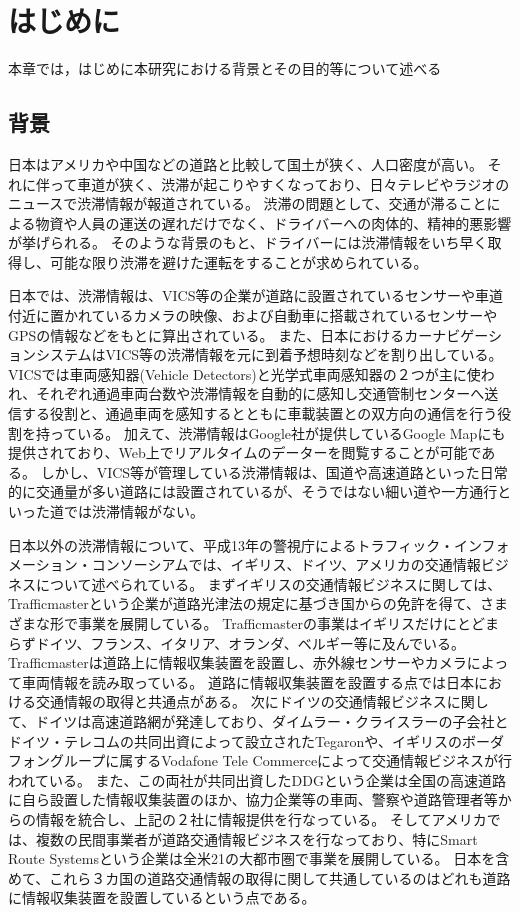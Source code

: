 \chapter{はじめに}
本章では，はじめに本研究における背景とその目的等について述べる
\section{背景}
日本はアメリカや中国などの道路と比較して国土が狭く、人口密度が高い。
それに伴って車道が狭く、渋滞が起こりやすくなっており、日々テレビやラジオのニュースで渋滞情報が報道されている。
渋滞の問題として、交通が滞ることによる物資や人員の運送の遅れだけでなく、ドライバーへの肉体的、精神的悪影響が挙げられる。
そのような背景のもと、ドライバーには渋滞情報をいち早く取得し、可能な限り渋滞を避けた運転をすることが求められている。

日本では、渋滞情報は、VICS等の企業が道路に設置されているセンサーや車道付近に置かれているカメラの映像、および自動車に搭載されているセンサーやGPSの情報などをもとに算出されている。
また、日本におけるカーナビゲーションシステムはVICS等の渋滞情報を元に到着予想時刻などを割り出している。
VICSでは車両感知器(Vehicle Detectors)と光学式車両感知器の２つが主に使われ、それぞれ通過車両台数や渋滞情報を自動的に感知し交通管制センターへ送信する役割と、通過車両を感知するとともに車載装置との双方向の通信を行う役割を持っている。
加えて、渋滞情報はGoogle社が提供しているGoogle Mapにも提供されており、Web上でリアルタイムのデーターを閲覧することが可能である。
しかし、VICS等が管理している渋滞情報は、国道や高速道路といった日常的に交通量が多い道路には設置されているが、そうではない細い道や一方通行といった道では渋滞情報がない。

日本以外の渋滞情報について、平成13年の警視庁によるトラフィック・インフォメーション・コンソーシアムでは、イギリス、ドイツ、アメリカの交通情報ビジネスについて述べられている。\cite{traffic_buisiness}
まずイギリスの交通情報ビジネスに関しては、Trafficmasterという企業が道路光津法の規定に基づき国からの免許を得て、さまざまな形で事業を展開している。
Trafficmasterの事業はイギリスだけにとどまらずドイツ、フランス、イタリア、オランダ、ベルギー等に及んでいる。
Trafficmasterは道路上に情報収集装置を設置し、赤外線センサーやカメラによって車両情報を読み取っている。
道路に情報収集装置を設置する点では日本における交通情報の取得と共通点がある。
次にドイツの交通情報ビジネスに関して、ドイツは高速道路網が発達しており、ダイムラー・クライスラーの子会社とドイツ・テレコムの共同出資によって設立されたTegaronや、イギリスのボーダフォングループに属するVodafone Tele Commerceによって交通情報ビジネスが行われている。
また、この両社が共同出資したDDGという企業は全国の高速道路に自ら設置した情報収集装置のほか、協力企業等の車両、警察や道路管理者等からの情報を統合し、上記の２社に情報提供を行なっている。
そしてアメリカでは、複数の民間事業者が道路交通情報ビジネスを行なっており、特にSmart Route Systemsという企業は全米21の大都市圏で事業を展開している。
日本を含めて、これら３カ国の道路交通情報の取得に関して共通しているのはどれも道路に情報収集装置を設置しているという点である。

